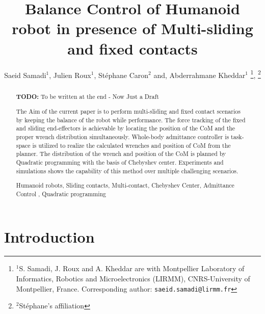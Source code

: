 \documentclass[letterpaper, 10pt, conference]{ieeeconf}
\title{\Large \bf
	Balance Control of Humanoid robot in presence of Multi-sliding and fixed contacts}
\author{Saeid Samadi$^{1}$, Julien Roux$^{1}$, St\'{e}phane Caron$^{2}$ and, Abderrahmane Kheddar$^{1}$
	\thanks{$^{1}$S. Samadi, J. Roux and A. Kheddar are with Montpellier Laboratory of Informatics,
		Robotics and Microelectronics (LIRMM), CNRS-University of Montpellier, France.
		Corresponding author: {\tt\footnotesize saeid.samadi@lirmm.fr}},
	 \thanks{$^{2}$St\'{e}phane's affiliation}
}
\newcommand{\TODO}[1]{{\color{red} {\bf TODO:} {#1}}}
\begin{document}
	
\maketitle
\thispagestyle{empty}
\pagestyle{empty}

\begin{abstract}
\TODO{To be written at the end - Now Just a Draft}

The Aim of the current paper is to perform multi-sliding and fixed contact scenarios by keeping the balance of the robot while performance. The force tracking of the fixed and sliding end-effectors is achievable by locating the position of the CoM and the proper wrench distribution simultaneously. Whole-body admittance controller is task-space is utilized to realize the calculated wrenches and position of CoM from the planner.
The distribution of the wrench and position of the CoM is planned by Quadratic programming with the basis of Chebyshev center.
Experiments and simulations shows the capability of this method over multiple challenging scenarios.

\begin{keywords}
Humanoid robots, Sliding contacts, Multi-contact, Chebyshev Center, Admittance Control , Quadratic programming
\end{keywords}
\end{abstract}


	
\begin{comment}

\begin{table}[h]
\renewcommand{\arraystretch}{1.5}
\caption{Table of Symbols}
\label{table_example}
\centering
\begin{tabular}{p{0.09\textwidth}|p{0.09\textwidth}||p{0.09\textwidth}|p{0.09\textwidth}}
\hline
\bfseries \centering First & \bfseries Next & me & you \\
\hline\hline
1.0 & 2.0\\
\hline
\end{tabular}
\end{table}
\end{comment}

\section{Introduction} \label{Sec_Introduction}
\end{document}

